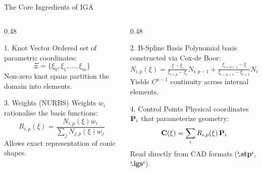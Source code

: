 \begin{frame}{The Core Ingredients of IGA}
  \begin{columns}[T]
    \begin{column}{0.48\textwidth}
      \begin{block}{1. Knot Vector}
        \scriptsize
        Ordered set of parametric coordinates:
        \[
          \Xi = \{\xi_0, \xi_1, \dots, \xi_m\}
        \]
        Non-zero knot spans partition the domain into elements.
      \end{block}
      \vspace{0.1cm}
      \begin{block}{3. Weights (NURBS)}
        \scriptsize
        Weights $w_i$ rationalise the basis functions:
        \[
          R_{i,p}(\xi) = \frac{N_{i,p}(\xi)w_i}{\sum_j N_{j,p}(\xi)w_j}
        \]
        Allows exact representation of conic shapes.
      \end{block}
    \end{column}

    \begin{column}{0.48\textwidth}
      \begin{block}{2. B-Spline Basis}
        \scriptsize
        Polynomial basis constructed via Cox-de Boor:
        \[
          N_{i,p}(\xi) = \tfrac{\xi-\xi_i}{\xi_{i+p}-\xi_i}N_{i,p-1} + \tfrac{\xi_{i+p+1}-\xi}{\xi_{i+p+1}-\xi_{i+1}}N_{i+1,p-1}
        \]
        Yields $C^{p-1}$ continuity across internal elements.
      \end{block}
      \vspace{0.1cm}
      \begin{block}{4. Control Points}
        \scriptsize
        Physical coordinates $\mathbf{P}_i$ that parameterize geometry:
        \[
          \mathbf{C}(\xi) = \sum_i R_{i,p}(\xi)\,\mathbf{P}_i
        \]
        Read directly from CAD formats (\textbf{`.stp`}, \textbf{`.igs`}).
      \end{block}
    \end{column}
  \end{columns}
\end{frame}

